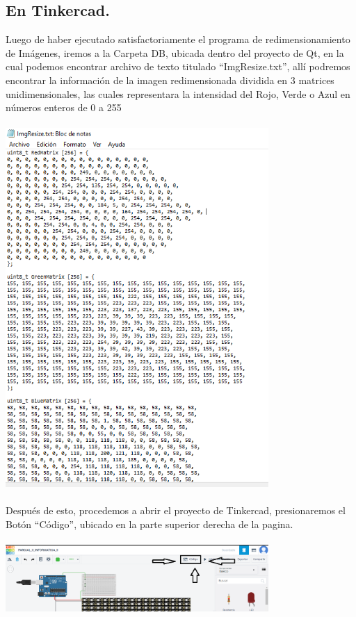 \documentclass{article}
\begin{document}
\subsection{En Tinkercad.}
Luego de haber ejecutado satisfactoriamente el programa de redimensionamiento de Imágenes, iremos a la Carpeta DB, ubicada dentro del proyecto de Qt, en la cual podemos encontrar archivo de texto titulado “ImgResize.txt”, allí podremos encontrar la información de la imagen redimensionada dividida en 3 matrices unidimensionales, las cuales representara la intensidad del Rojo, Verde o Azul en números enteros de 0 a 255
\\
\\
\includegraphics[width=10cm]{info_img_txt.PNG}
\\
\\
Después de esto, procedemos a abrir el proyecto de Tinkercad, presionaremos el Botón “Código”, ubicado en la parte superior derecha de la pagina.
\\
\\
\includegraphics[width=10cm]{codigo.PNG}
\end{document}
